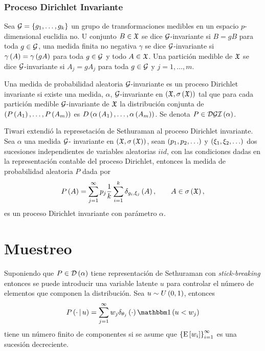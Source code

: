 \documentclass[runningheads,a4paper]{article}
\begin{document}
\subsubsection{Proceso Dirichlet Invariante}

Sea $\mathcal{G} = \left\{ g_1, \ldots, g_{k} \right\}$ un grupo de transformaciones medibles en un espacio $p$-dimensional euclidia%
no. U conjunto $B \in \mathfrak{X}$ se dice $\mathcal{G}$-invariante si $B = gB$ para toda $g \in \mathcal{G}$, una medida finita no %
negativa $\gamma$ se dice $\mathcal{G}$-invariante si $\gamma\left( A \right) = \gamma\left( gA \right)$ para toda $g \in \mathcal{G}$ y todo $A %
\in \X$. Una partición medible de $\mathfrak{X}$ se dice $\mathcal{G}$-invariante si $A_{j} = gA_{j}$ para toda $g \in \mathcal{G}$ y %
$j = 1, \ldots, m$.

\begin{defi}[Dalal]
Una medida de probabilidad aleatoria $\mathcal{G}$-invariante es un proceso Dirichlet invariante si existe una medida, %
$\alpha$, $\mathcal{G}$-invariante en $\left( \mathfrak{X}, \sigma\left( \mathfrak{X} \right) \right)$ tal que para cada partición medible $\mathcal{G}$-invariante %
de $\mathfrak{X}$ la distribución conjunta de $\left( P\left( A_{1} \right), \ldots, P\left( A_{m} \right) \right)$ es $D\Pp{\alpha\Pp{A_{1}}, \ldots, %
\alpha\Pp{A_{m}}}$. Se denota $P \in \mathcal{DGI}\left( \alpha \right)$.
\end{defi}

Tiwari extendió la represetación de Sethuraman al proceso Dirichlet invariante. Sea $\alpha$ una medida $\mathcal{G}$-%
invariante en $\left( \mathfrak{X}, \sigma\left( \mathfrak{X} \right) \right)$, sean $\left( p_{1}, p_{2},\ldots \right)$ y $\left( \xi_{1}, \xi_{2}, \ldots \right)$ dos %
sucesiones independientes de variables aleatorias $iid$, con las condiciones dadas en la representación %
contable del proceso Dirichlet, entonces la medida de probabilidad aleatoria $P$ dada por
\[
P\left( A \right) = \sum_{j = 1}^{\infty} p_{j} \frac{1}{k} \sum_{i = 1}^{k} \delta_{g_{i}, \xi_{j}}\left( A \right), \qquad
            A \in \sigma\left( \mathfrak{X} \right),
\]
es un proceso Dirichlet invariante con parámetro $\alpha$.


\section{Muestreo}

Suponiendo que $P \in \mathcal{D}\left( \alpha \right)$ tiene representación de Sethuraman con \textit{stick-breaking} entonces se %
puede introducir una variable latente $u$ para controlar el número de elementos que componen la distribución. Sea %
$u \sim U\left( 0, 1 \right)$, entonces
\[
P\Pp{\cdot \,|\, u} = \sum_{j = 1}^{\infty} w_{j} \delta_{\theta_{j}}\Pp{\cdot} \Ind\Pp{u < w_{j}}
\]
tiene un número finito de componentes si se asume que $\left\{ \mathrm{E}\left[ w_{i} \right] \right\}_{i = 1}^{\infty}$ es una sucesión decreciente.
\end{document}
